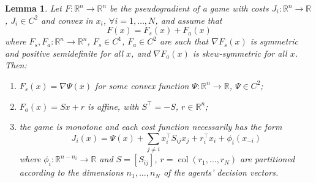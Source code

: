 \documentclass[10pt,a4paper]{amsart}
\newtheorem{lemma}{Lemma}
\newcommand{\rr}{\mathbb{R}}
\begin{document}
\begin{lemma}
\label{lem:splitting}
Let $F:\rr^n\to\rr^n$ be the pseudogradient of a game with
costs $J_i:\rr^n\to\rr$, $J_i\in C^2$ and convex in $x_i$, $\forall i=1,\ldots,N$,
and assume that
\begin{equation}
F(x)=F_s(x)+F_a(x)
\label{eq:F(x)-split}
\end{equation}
where $F_s,F_a:\rr^n\to\rr^n$, $F_s\in C^1$, $F_a\in C^2$ are such that
$\nabla F_s(x)$ is symmetric and positive semidefinite for all $x$, and
$\nabla F_a(x)$ is skew-symmetric for all $x$. Then:
\begin{enumerate}
\item[($i$)] $F_s(x)=\nabla\Psi(x)$ for some convex function
$\Psi:\rr^n\to\rr$, $\Psi\in C^2$;
\item[($ii$)] $F_a(x)=Sx+r$ is affine, with $S^\top=-S$,
$r\in\rr^n$;
\item[($iii$)] the game is monotone and each cost function necessarily has
the form
\begin{equation}
J_i(x)=\Psi(x)+\sum_{j\neq i}x_i^\top S_{ij}x_j+r_i^\top x_i
+\phi_i(x_{-i})
\label{eq:J_i-form}
\end{equation}
where $\phi_i:\rr^{n-n_i}\to\rr$ and
$S=[S_{ij}]$, $r=\operatorname{col}(r_1,\ldots,r_N)$ are partitioned
according to the dimensions $n_1,\ldots,n_N$ of the agents' decision vectors.
\end{enumerate}
\end{lemma}
\end{document}
